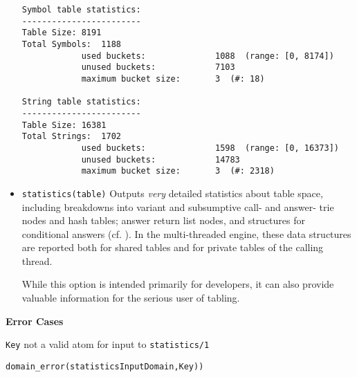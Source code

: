 \begin{description}
\begin{itemize}
{\begin{verbatim}
Symbol table statistics:
------------------------
Table Size:	8191
Total Symbols:	1188
            used buckets:              1088  (range: [0, 8174])
            unused buckets:            7103
            maximum bucket size:       3  (#: 18)

String table statistics:
------------------------
Table Size:	16381
Total Strings:	1702
            used buckets:              1598  (range: [0, 16373])
            unused buckets:            14783
            maximum bucket size:       3  (#: 2318)
\end{verbatim}}
%
\item {\tt statistics(table)} Outputs {\em very} detailed statistics
  about table space, including breakdowns into variant and subsumptive
  call- and answer- trie nodes and hash tables; answer return list
  nodes, and structures for conditional answers (cf. \cite{SaSw98,
    RRSSW98, TST99, CuSW99a}).  In the multi-threaded engine, these
  data structures are reported both for shared tables and for private
  tables of the calling thread.

  While this option is intended primarily for developers, it can also
  provide valuable information for the serious user of tabling.
\end{itemize}

{\bf Error Cases}
\bi
\item {\tt Key} not a valid atom for input to {\tt statistics/1} 
\bi
\item 	{\tt domain\_error(statisticsInputDomain,Key))}
\ei
\ei


\end{description}
